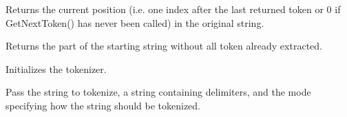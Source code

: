Returns the current position (i.e. one index after the last returned
token or 0 if GetNextToken() has never been called) in the original
string.


\label{wxstringtokenizergetstring}


Returns the part of the starting string without all token already extracted.


\label{wxstringtokenizersetstring}


Initializes the tokenizer.

Pass the string to tokenize, a string containing delimiters,
and the mode specifying how the string should be tokenized.

